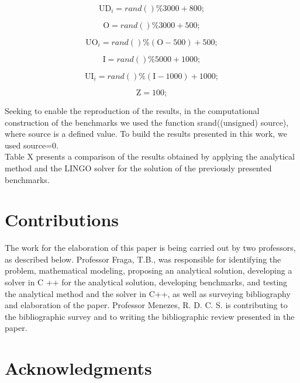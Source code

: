 \documentclass[preprint,12pt,authoryear]{elsarticle}
\begin{document}
\begin{equation}
\textrm{UD}_i = rand()\%3000 + 800;
\end{equation}

\begin{equation}
\textrm{O} = rand()\%3000 + 500;
\end{equation}

\begin{equation}
\textrm{UO}_i = rand()\%(\textrm{O}-500) + 500;
\end{equation}

\begin{equation}
\textrm{I} = rand()\%5000 + 1000;
\end{equation}

\begin{equation}
\textrm{UI}_i = rand()\%(\textrm{I}-1000) + 1000;
\end{equation}

\begin{equation}
\textrm{Z} = 100;
\end{equation}

Seeking to enable the reproduction of the results, in the computational construction of the benchmarks we used the function srand((unsigned) source), where source is a defined value. To build the results presented in this work, we used source=0. \\

Table X presents a comparison of the results obtained by applying the analytical method and the LINGO solver for the solution of the previously presented benchmarks.

\section{Contributions}
\label{sec:contributions}

The work for the elaboration of this paper is being carried out by two professors, as described below. Professor Fraga, T.B., was responsible for identifying the problem, mathematical modeling, proposing an analytical solution, developing a solver in C ++ for the analytical solution, developing benchmarks, and testing the analytical method and the solver in C++, as well as surveying bibliography and elaboration of the paper. Professor Menezes, R. D. C. S. is contributing to the bibliographic survey and to writing the bibliographic review presented in the paper. 

\section{Acknowledgments}
\label{sec:acknowledgments}
\end{document}
